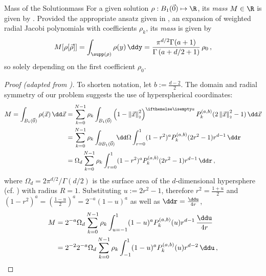 \begin{lemma}{Mass of the Solution}{mass}
  For a given solution $\rho: B_1(\vec{0}) \mapsto \R$, its \textit{mass} $M \in \R$ is given by .
  Provided the appropriate ansatz given in , an expansion of weighted radial Jacobi polynomials with coefficients $\rho_k$, its \textit{mass} is given by
  \begin{align*}
    M[\rho[\vec{\rho}]] = \int_{\supp(\rho)} \rho(y) \,\ddy = \frac{\pi^{{d/2}}\Gamma (a+1)}{\Gamma \left(a+{d/2}+1\right)}\, \rho_0\,,
  \end{align*}
  so solely depending on the first coefficient $\rho_0$.
\end{lemma}
\begin{proof}[Proof (adapted from \cite{2021-arbitrary-dimensions})]
  To shorten notation, let $b := \frac{d-2}{2}$.
  The domain and radial symmetry of our problem suggests the use of hyperspherical coordinates:
  \begin{align*}
    M = \int_{B_1(\vec{0})} \rho(\vec{x}) \,\dd\vec{x} & = \sum_{k=0}^{N-1} \rho_k \int_{B_1(\vec{0})} \weight{x} P_k^{(a,b)}(\jacobiarg{x}) \,\dd\vec{x}                          \\
                                                       & =\sum_{k=0}^{N-1} \rho_k \int_{\partial B_1(\vec{0})} \dd\Omega \int_{r=0}^1 (1-r^2)^a P_k^{(a,b)}(2r^2-1) r^{d-1} \,\ddr \\
                                                       & = \Omega_d \sum_{k=0}^{N-1} \rho_k \int_{r=0}^1 (1-r^2)^a P_k^{(a,b)}(2r^2-1) r^{d-1} \,\ddr\,,
  \end{align*}
  where $\Omega_d = {2\pi^{d/2}} / {\Gamma({d/2})}$ is the surface area of the $d$-dimensional hypersphere (cf. ) with radius $R = 1$.
  Substituting $u := 2r^2-1$, therefore $r^2 = \frac{1+u}{2}$ and $(1-r^2)^a = \left(\frac{1-u}{2}\right)^a = 2^{-a} (1-u)^a$ as well as $\ddr = \frac{\ddu}{4r}$,
  \begin{align*}
    M & = 2^{-a} \Omega_d \sum_{k=0}^{N-1} \rho_k \int_{u=-1}^1 (1-u)^a P_k^{(a,b)}(u) r^{d-1} \,\frac{\ddu}{4r} \\
      & = 2^{-2} 2^{-a} \Omega_d \sum_{k=0}^{N-1} \rho_k \int_{-1}^1 (1-u)^a P_k^{(a,b)}(u) r^{d-2}\,\ddu\,,

\end{align*}
\end{proof}
